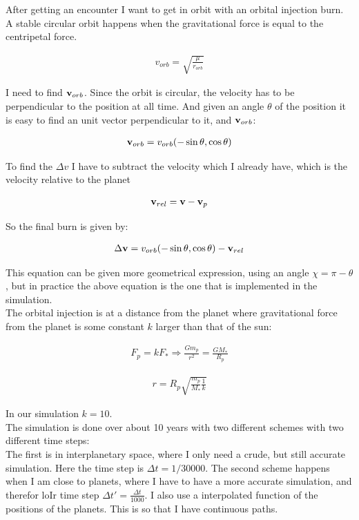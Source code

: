 \documentclass[a4paper, 10pt]{article}
\begin{document}
After getting an encounter I want to get in orbit with an orbital injection burn. A stable circular orbit happens when the gravitational force is equal to the centripetal force.

\begin{align}
v_{orb} = \sqrt{\frac{\mu}{r_{orb}}}
\end{align}

I need to find $\bold{v}_{orb}$. Since the orbit is circular, the velocity has to be perpendicular to the position at all time. And given an angle $\theta$ of the position it is easy to find an unit vector perpendicular to it, and $\bold{v}_{orb}$:

\begin{align}
\bold{v}_{orb} = v_{orb}(-\sin\theta,\cos\theta)
\end{align}

To find the $\Delta v$ I have to subtract the velocity which I already have, which is the velocity relative to the planet

\begin{align}
\bold{v}_{rel} = \bold{v} - \bold{v}_p
\end{align} 

So the final burn is given by:

\begin{align}
\Delta \bold{v} = v_{orb}(-\sin\theta,\cos\theta) - \bold{v}_{rel}
\end{align}

This equation can be given more geometrical expression, using an angle $\chi = \pi - \theta$, but in practice the above equation is the one that is implemented in the simulation.\\

The orbital injection is at a distance from the planet where gravitational force from the planet is some constant $k$ larger than that of the sun:

\begin{align}
F_p = kF_* \Rightarrow \frac{Gm_p}{r^2} = \frac{GM_*}{R_p}
\end{align}


\begin{align}\label{eq:safeDist}
r = R_p\sqrt{\frac{m_p}{M_*}\frac{1}{k}}
\end{align}

In our simulation $k = 10$. \\

The simulation is done over about 10 years with two different schemes with two different time steps:\\
The first is in interplanetary space, where I only need a crude, but still accurate simulation. Here the time step is $\Delta t = 1/30000$. The second scheme happens when I am close to planets, where I have to have a more accurate simulation, and therefor loIr time step $\Delta t' =\frac{\Delta t}{1000}$. I also use a interpolated function of the positions of the planets. This is so that I have continuous paths.\\
\end{document}
